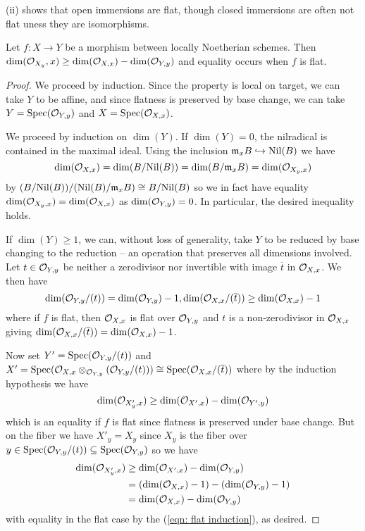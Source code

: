\begin{example}
     (ii) shows that open immersions are flat, though closed immersions are often not flat uness they are isomorphisms. 
\end{example}
\begin{proposition}\label{prop: dimension criterion for flatness}
    Let $f:X\to Y$ be a morphism between locally Noetherian schemes. Then $\dim(\mathcal{O}_{X_{y}},x)\geq\dim(\mathcal{O}_{X,x})-\dim(\mathcal{O}_{Y,y})$ and equality occurs when $f$ is flat.
\end{proposition}
\begin{proof}
    We proceed by induction. Since the property is local on target, we can take $Y$ to be affine, and since flatness is preserved by base change, we can take $Y=\operatorname{Spec}(\mathcal{O}_{Y,y})$ and $X=\operatorname{Spec}(\mathcal{O}_{X,x})$. 

    We proceed by induction on $\dim(Y)$. If $\dim(Y)=0$, the nilradical is contained in the maximal ideal. Using the inclusion $\mathfrak{m}_{x}B\hookrightarrow\mathrm{Nil}(B)$ we have 
    $$\dim(\mathcal{O}_{X,x})=\dim(B/\mathrm{Nil}(B))=\dim(B/\mathfrak{m}_{x}B)=\dim(\mathcal{O}_{X_{y},x})$$ 
    by $(B/\mathrm{Nil}(B))/(\mathrm{Nil}(B)/\mathfrak{m}_{x}B)\cong B/\mathrm{Nil}(B)$ so we in fact have equality $\dim(\mathcal{O}_{X_{y},x})=\dim(\mathcal{O}_{X,x})$ as $\dim(\mathcal{O}_{Y,y})=0$. In particular, the desired inequality holds. 

    If $\dim(Y)\geq 1$, we can, without loss of generality, take $Y$ to be reduced by base changing to the reduction -- an operation that preserves all dimensions involved. Let $t\in\mathcal{O}_{Y,y}$ be neither a zerodivisor nor invertible with image $\overline{t}$ in $\mathcal{O}_{X,x}$. We then have 
    $$\dim(\mathcal{O}_{Y,y}/(t))=\dim(\mathcal{O}_{Y,y})-1, \dim(\mathcal{O}_{X,x}/(\overline{t}))\geq\dim(\mathcal{O}_{X,x})-1$$
    where if $f$ is flat, then $\mathcal{O}_{X,x}$ is flat over $\mathcal{O}_{Y,y}$ and $t$ is a non-zerodivisor in $\mathcal{O}_{X,x}$ giving $\dim(\mathcal{O}_{X,x}/(\overline{t}))=\dim(\mathcal{O}_{X,x})-1$. 

    Now set $Y'=\operatorname{Spec}(\mathcal{O}_{Y,y}/(t))$ and $X'=\operatorname{Spec}(\mathcal{O}_{X,x}\otimes_{\mathcal{O}_{Y,y}}(\mathcal{O}_{Y,y}/(t)))\cong\operatorname{Spec}(\mathcal{O}_{X,x}/(\overline{t}))$ where by the induction hypothesis we have 
    \begin{equation}\label{eqn: flat induction}
        \dim(\mathcal{O}_{X'_{y},x})\geq\dim(\mathcal{O}_{X',x})-\dim(\mathcal{O}_{Y',y})
    \end{equation}
    which is an equality if $f$ is flat since flatness is preserved under base change. But on the fiber we have $X'_{y}=X_{y}$ since $X_{y}$ is the fiber over $y\in\operatorname{Spec}(\mathcal{O}_{Y,y}/(t))\subseteq\operatorname{Spec}(\mathcal{O}_{Y,y})$ so we have 
    \begin{align*}
        \dim(\mathcal{O}_{X'_{y},x}) &\geq \dim(\mathcal{O}_{X',x})-\dim(\mathcal{O}_{Y,y}) \\
        &= (\dim(\mathcal{O}_{X,x})-1) - (\dim(\mathcal{O}_{Y,y})-1) \\
        &= \dim(\mathcal{O}_{X,x})-\dim(\mathcal{O}_{Y,y}) 
    \end{align*}
    with equality in the flat case by the (\ref{eqn: flat induction}), as desired. 
\end{proof}
